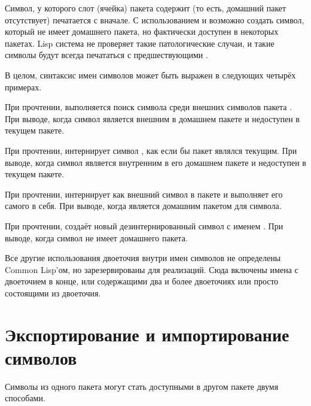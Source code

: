 Символ, у которого слот (ячейка) пакета содержит {\false} (то есть, домашний
пакет отсутствует) печатается с \cd{\#:} вначале. С использованием 
и  возможно создать символ, который не имеет домашнего пакета, но
фактически доступен в некоторых пакетах.
Lisp система не проверяет такие патологические случаи, и такие символы будут
всегда печататься с предшествующими \cd{\#:}.

В целом, синтаксис имен символов может быть выражен в следующих четырёх примерах.

\begin{flushdesc}
\item[\cd{foo:bar}]
При прочтении, выполняется поиск символа  среди внешних символов пакета
. При выводе, когда символ  является внешним в домашнем пакете
 и недоступен в текущем пакете.

\item[\cd{foo::bar}]
При прочтении, интернирует символ , как если бы пакет  являлся
текущим. При выводе, когда символ  является внутренним в его домашнем
пакете  и недоступен в текущем пакете.

\item[\cd{:bar}]
При прочтении, интернирует  как внешний символ в пакете  и
выполняет его самого в себя. При выводе, когда  является домашним
пакетом для символа.

\item[\cd{\#:bar}]
При прочтении, создаёт новый дезинтернированный символ с именем .
При выводе, когда символ  не имеет домашнего пакета.
\end{flushdesc}

Все другие использования двоеточия внутри имен символов не определены Common
Lisp'ом, но зарезервированы для реализаций. Сюда включены имена с двоеточием в
конце, или содержащими два и более двоеточиях или просто состоящими из
двоеточия.

\section{Экспортирование и импортирование символов} 
\label{EXPORT-IMPORT-SECTION}

Символы из одного пакета могут стать доступными в другом пакете двумя способами.

